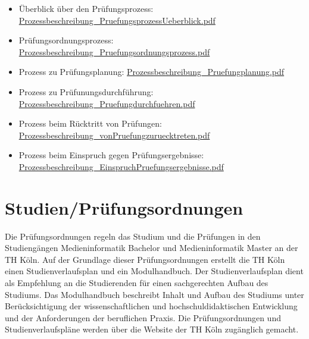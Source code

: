 \begin{itemize}
\tightlist
\item
  Überblick über den Prüfungsprozess:
  \href{../anhaenge/Prozessbeschreibung_PruefungsprozessUeberblick.pdf}{Prozessbeschreibung\_PruefungsprozessUeberblick.pdf}
\item
  Prüfungsordnungsprozess:
  \href{../anhaenge/Prozessbeschreibung_Pruefungsordnungsprozess.pdf}{Prozessbeschreibung\_Pruefungsordnungsprozess.pdf}
\item
  Prozess zu Prüfungsplanung:
  \href{../anhaenge/Prozessbeschreibung_Pruefungplanung.pdf}{Prozessbeschreibung\_Pruefungplanung.pdf}
\item
  Prozess zu Prüfunungsdurchführung:
  \href{../anhaenge/Prozessbeschreibung_Pruefungdurchfuehren.pdf}{Prozessbeschreibung\_Pruefungdurchfuehren.pdf}
\item
  Prozess beim Rücktritt von Prüfungen:
  \href{../anhaenge/Prozessbeschreibung_vonPruefungzuruecktreten.pdf}{Prozessbeschreibung\_vonPruefungzuruecktreten.pdf}
\item
  Prozess beim Einspruch gegen Prüfungsergebnisse:
  \href{../anhaenge/Prozessbeschreibung_EinspruchPruefungsergebnisse.pdf}{Prozessbeschreibung\_EinspruchPruefungsergebnisse.pdf}
\end{itemize}

\section{Studien/Prüfungsordnungen}\label{studienpruxfcfungsordnungen-1}

Die Prüfungsordnungen regeln das Studium und die Prüfungen in den
Studiengängen Medieninformatik Bachelor und Medieninformatik Master an
der TH Köln. Auf der Grundlage dieser Prüfungsordnungen erstellt die TH
Köln einen Studienverlaufsplan und ein Modulhandbuch. Der
Studienverlaufsplan dient als Empfehlung an die Studierenden für einen
sachgerechten Aufbau des Studiums. Das Modulhandbuch beschreibt Inhalt
und Aufbau des Studiums unter Berücksichtigung der wissenschaftlichen
und hochschuldidaktischen Entwicklung und der Anforderungen der
beruflichen Praxis. Die Prüfungsordnungen und Studienverlaufspläne
werden über die Website der TH Köln zugänglich gemacht.

